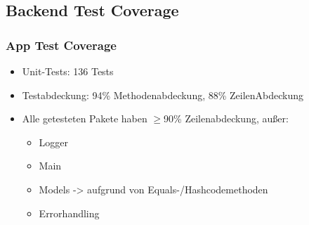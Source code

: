 \subsection*{Backend Test Coverage}

\begin{frame}\frametitle{App Test Coverage}
    \begin{itemize}
        \item Unit-Tests: 136 Tests
        \item Testabdeckung: 94\% Methodenabdeckung, 88\% ZeilenAbdeckung
        \item Alle getesteten Pakete haben $\geq$90\% Zeilenabdeckung, außer: 
        \begin{itemize}
            \item Logger
            \item Main
            \item Models -> aufgrund von Equals-/Hashcodemethoden 
            \item Errorhandling
        \end{itemize}
    \end{itemize}
\end{frame}